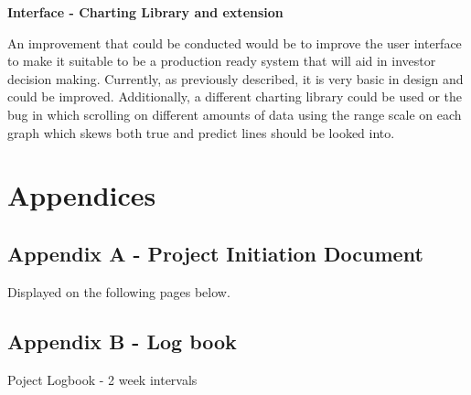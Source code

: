 \documentclass[oneside, 12pt]{article}
\begin{document}
		\textbf{Interface - Charting Library and extension}
	
		An improvement that could be conducted would be to improve the user interface to make it suitable to be a production ready system that will aid in investor decision making. Currently, as previously described, it is very basic in design and could be improved. Additionally, a different charting library could be used or the bug in which scrolling on different amounts of data using the range scale on each graph which skews both true and predict lines should be looked into.
		
	\newpage
	
	\nocite{*}
	\printbibliography
	
	\newpage
	\section{Appendices}
		\subsection{Appendix A - Project Initiation Document}
		Displayed on the following pages below.
		
		
		\subsection{Appendix B - Log book}
		
		\begin{center}
			Poject Logbook - 2 week intervals
		\end{center}
		
\end{document}
